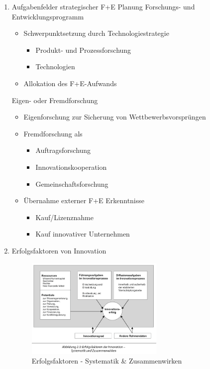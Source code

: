 \documentclass[11pt]{article}
\begin{document}
\begin{enumerate}
\item Aufgabenfelder strategischer F+E Planung
\label{sec:org315f189}
Forschungs- und Entwicklungsprogramm
\begin{itemize}
\item Schwerpunktsetzung durch Technologiestrategie
\begin{itemize}
\item Produkt- und Prozessforschung
\item Technologien
\end{itemize}
\item Allokation des F+E-Aufwands
\end{itemize}

Eigen- oder Fremdforschung
\begin{itemize}
\item Eigenforschung zur Sicherung von Wettbewerbsvorsprüngen
\item Fremdforschung als 
\begin{itemize}
\item Auftragsforschung
\item Innovationskooperation
\item Gemeinschaftsforschung
\end{itemize}
\item Übernahme externer F+E Erkenntnisse
\begin{itemize}
\item Kauf/Lizenznahme
\item Kauf innovativer Unternehmen
\end{itemize}
\end{itemize}

\item Erfolgsfaktoren von Innovation
\label{sec:org0fd0fe7}
\begin{figure}[htbp]
\centering
\includegraphics[width=250px]{./pictures/inerf.png}
\caption{Erfolgsfaktoren - Systematik \& Zusammenwirken}
\end{figure}
\end{enumerate}
\end{document}
